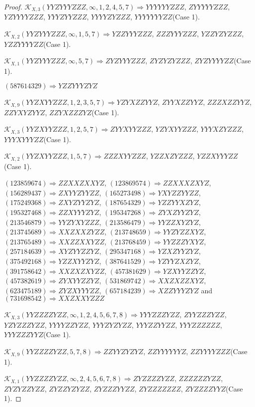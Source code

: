 \documentclass[12pt]{article}
\theoremstyle{plain}
\theoremstyle{definition}
\theoremstyle{remark}
\newcommand{\fancy}[1]{\mathcal{#1}}
\def\K{\fancy{K}}
\begin{document}
\begin{proof}
	$\K_{X,3}(YYZYYYZZZ,\infty,1, 2, 4, 5, 7)\Rightarrow $$YYYYYYZZZ$, $ZYYYYYZZZ$, $YZYYYYZZZ$, $YYYZYYZZZ$, $YYYYZYZZZ$, $YYYYYYYZZ$(Case 1).
	
	$\K_{X,2}(YYZYYYZZZ,\infty,1, 5, 7)\Rightarrow $$YZZYYYZZZ$, $ZZZYYYZZZ$, $YZZYZYZZZ$, $YZZYYYYZZ$(Case 1).
	
	$\K_{X,1}(YYZYYYZZZ,\infty,5, 7)\Rightarrow $$ZYZYYYZZZ$, $ZYZYZYZZZ$, $ZYZYYYYZZ$(Case 1).
	
	
	
	$(5 8 7 6 1 4 3 2 9)\Rightarrow YZZYYYZYZ$
	
	
	$\K_{X,9}(YYZXYYZZZ,1, 2, 3, 5, 7)\Rightarrow $$YZYXZZYYZ$, $ZYYXZZYYZ$, $ZZZXZZYYZ$, $ZZYXYZYYZ$, $ZZYXZZZYZ$(Case 1).
	
	$\K_{X,3}(YYZXYYZZZ,1, 2, 5, 7)\Rightarrow $$ZYYXYYZZZ$, $YZYXYYZZZ$, $YYYXZYZZZ$, $YYYXYYYZZ$(Case 1).
	
	$\K_{X,2}(YYZXYYZZZ,1, 5, 7)\Rightarrow $$ZZZXYYZZZ$, $YZZXZYZZZ$, $YZZXYYYZZ$(Case 1).
	
	
	
	$(1 2 3 8 5 9 6 7 4)\Rightarrow ZZXXZXXYZ$, $(1 2 3 8 6 9 5 7 4)\Rightarrow ZZXXXZXYZ$, $(1 5 6 2 8 9 4 3 7)\Rightarrow ZXYYZYYZZ$, $(1 6 5 2 7 3 4 9 8)\Rightarrow YXYZZYYZZ$, $(1 7 5 2 4 9 3 6 8)\Rightarrow ZXYZYYZYZ$, $(1 8 7 6 5 4 3 2 9)\Rightarrow YZZYYXZYZ$, $(1 9 5 3 2 7 4 6 8)\Rightarrow ZZXYYYZYZ$, $(1 9 5 3 4 7 2 6 8)\Rightarrow ZYXZYYZYZ$, $(2 1 3 5 4 6 8 7 9)\Rightarrow YYZYXYZZZ$, $(2 1 3 5 8 6 4 7 9)\Rightarrow YYZZXYZYZ$, $(2 1 3 7 4 5 6 8 9)\Rightarrow XXZXXZYZZ$, $(2 1 3 7 4 8 6 5 9)\Rightarrow YYZYZZXYZ$, $(2 1 3 7 6 5 4 8 9)\Rightarrow XXZZXXYZZ$, $(2 1 3 7 6 8 4 5 9)\Rightarrow YYZZZYXYZ$, $(2 5 7 1 8 4 6 3 9)\Rightarrow XYZYYZZYZ$, $(2 9 5 3 4 7 1 6 8)\Rightarrow YZXZYYZYZ$, $(3 7 5 4 9 2 1 6 8)\Rightarrow YZZXYYZYZ$, $(3 8 7 6 4 1 5 2 9)\Rightarrow YZYYZXZYZ$, $(3 9 1 7 5 8 6 4 2)\Rightarrow XXZXZXYZZ$, $(4 5 7 3 8 1 6 2 9)\Rightarrow YZXYYZZYZ$, $(4 5 7 3 8 2 6 1 9)\Rightarrow ZYXYYZZYZ$, $(5 3 1 8 6 9 7 4 2)\Rightarrow XXZXZZXYZ$, $(6 2 3 4 7 5 1 8 9)\Rightarrow ZYZXYYYZZ$, $(6 5 7 1 8 4 2 3 9)\Rightarrow XZZYYYZYZ$ and $(7 3 1 6 9 8 5 4 2)\Rightarrow XXZXXYZZZ$
	
	
	$\K_{X,3}(YYZZZZYZZ,\infty,1, 2, 4, 5, 6, 7, 8)\Rightarrow $$YYYZZZYZZ$, $ZYYZZZYZZ$, $YZYZZZYZZ$, $YYYYZZYZZ$, $YYYZYZYZZ$, $YYYZZYYZZ$, $YYYZZZZZZ$, $YYYZZZYYZ$(Case 1).
	
	$\K_{X,9}(YYZZZZYZZ,5, 7, 8)\Rightarrow $$ZZYYZYZYZ$, $ZZYYYYYYZ$, $ZZYYYYZZZ$(Case 1).
	
	$\K_{X,1}(YYZZZZYZZ,\infty,2, 4, 5, 6, 7, 8)\Rightarrow $$ZYZZZZYZZ$, $ZZZZZZYZZ$, $ZYZYZZYZZ$, $ZYZZYZYZZ$, $ZYZZZYYZZ$, $ZYZZZZZZZ$, $ZYZZZZYYZ$(Case 1).
	

\end{proof}
\end{document}
